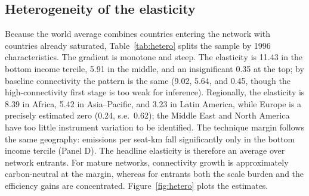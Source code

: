 \documentclass[12pt]{article}
\begin{document}
\subsection{Heterogeneity of the elasticity}
Because the world average combines countries entering the network with
countries already saturated, Table~\ref{tab:hetero} splits the sample by
1996 characteristics. The gradient is monotone and steep. The elasticity is
11.43 in the bottom income tercile, 5.91 in the middle, and an
insignificant 0.35 at the top; by baseline connectivity the pattern is the
same (9.02, 5.64, and 0.45, though the high-connectivity first stage is too
weak for inference). Regionally, the elasticity is 8.39 in Africa, 5.42 in
Asia--Pacific, and 3.23 in Latin America, while Europe is a precisely
estimated zero (0.24, s.e.\ 0.62); the Middle East and North America have
too little instrument variation to be identified. The technique margin
follows the same geography: emissions per seat-km fall significantly only
in the bottom income tercile (Panel D). The headline elasticity is
therefore an average over network entrants. For mature networks,
connectivity growth is approximately carbon-neutral at the margin, whereas
for entrants both the scale burden and the efficiency gains are
concentrated. Figure~\ref{fig:hetero} plots the estimates.
\end{document}
